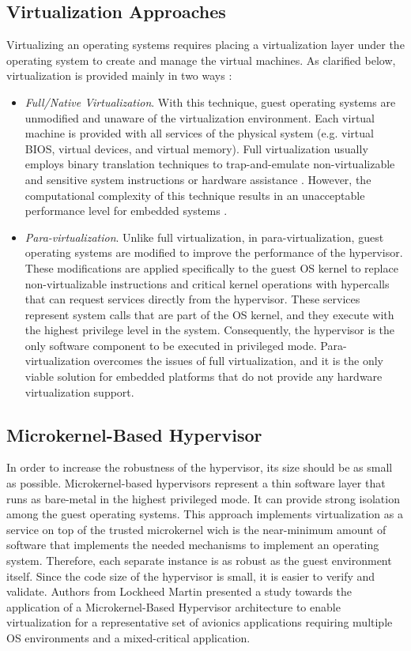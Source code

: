 \subsection{Virtualization Approaches}
Virtualizing an operating systems requires placing a virtualization layer under the operating system to create and manage the virtual machines. As clarified below, virtualization is provided mainly in two ways \cite{practicalmicrokernel}:
\begin{itemize}
\item \emph{Full/Native Virtualization}. With this technique, guest operating systems are unmodified and unaware of the virtualization environment. Each virtual machine is provided with all services of the physical system (e.g. virtual BIOS, virtual devices, and virtual memory). Full virtualization usually employs binary translation techniques to trap-and-emulate non-virtualizable and sensitive system instructions or hardware assistance \cite{vmwarevirtualization}. However, the computational complexity of this technique results in an unacceptable performance level for embedded systems \cite{Kleidermacher2013}.
\item \emph{Para-virtualization}. Unlike full virtualization, in para-virtualization, guest operating systems are modified to improve the performance of the hypervisor. These modifications are applied specifically to the guest OS kernel to replace non-virtualizable instructions and critical kernel operations with hypercalls that can request services directly from the hypervisor. These services represent system calls that are part of the OS kernel, and they execute with the highest privilege level in the system. Consequently, the hypervisor is the only software component to be executed in privileged mode. Para-virtualization overcomes the issues of full virtualization, and it is the only viable solution for embedded platforms that do not provide any hardware virtualization support\cite{Kleidermacher2013}.
\end{itemize}

\subsection{Microkernel-Based Hypervisor}
In order to increase the robustness of the hypervisor, its size should be as small as possible. Microkernel-based hypervisors represent a thin software layer that runs as bare-metal in the highest privileged mode. It can provide strong isolation among the guest operating systems. This approach implements virtualization as a service on top of the trusted microkernel wich is the near-minimum amount of software that implements the needed mechanisms to implement an operating system. Therefore, each separate instance is as robust as the guest environment itself. Since the code size of the hypervisor is small, it is easier to verify and validate. Authors from Lockheed Martin \cite{LockheedMartinVMIMA} presented a study towards the application of a Microkernel-Based Hypervisor architecture to enable virtualization for a representative set of avionics applications requiring multiple OS environments and a mixed-critical application. 

